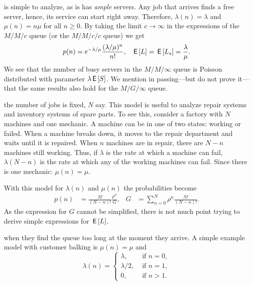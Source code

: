  is simple to analyze, as is has \emph{ample} servers.
Any job that arrives finds a free server, hence, its service can start right away.
Therefore, $\lambda(n)=\lambda$ and $\mu(n) = n \mu$ for all $n\geq 0$.
By taking the limit $c\to \infty$ in the expressions of the $M/M/c$ queue (or the $M/M/c/c$ queue) we get
\begin{align*}
  p(n) &= e^{-\lambda/\mu} \frac{(\lambda/\mu)^n}{n!}, & \,\mathsf{E}\left[L\right] = \,\mathsf{E}\left[L_s\right] = \frac \lambda \mu.
\end{align*}
We see that the number of busy servers in the $M/M/\infty$ queue is Poisson distributed with parameter $\lambda \,\mathsf{E}\left[S\right]$.
We mention in passing---but do not prove it---that the same results also hold for the $M/G/\infty$ queue.

 the number of jobs is fixed, $N$ say.
This model is useful to analyze repair systems and inventory systems of spare parts.
To see this, consider a factory with $N$ machines and one mechanic.
A machine can be in one of two states: working or failed.
When a machine breaks down, it moves to the repair department and waits until it is repaired.
When $n$ machines are in repair, there are $N-n$ machines still working.
Thus, if $\lambda$ is the rate at which a machine can fail, $\lambda(N-n)$ is the rate at which any of the working machines can fail.
Since there is one mechanic: $\mu(n)=\mu$.


With this model for $\lambda(n)$ and $\mu(n)$ the probabilities become 
\begin{align*}
 p(n)  &= \frac{N!}{(N-n)!}\frac{\rho^n}{G}, & G &= \sum_{n=0}^N \rho^n \frac{N!}{(N-n)!}.
\end{align*}
As the expression for $G$ cannot be simplified, there is not much point trying to derive simple expressions for $\,\mathsf{E}\left[L\right]$.


 when they find the queue too long at the moment they arrive.
A simple example model with customer balking is $\mu(n)=\mu$ and
 \begin{equation*}
 \lambda(n) =
 \begin{cases}
 \lambda, &\text{ if } n=0, \\
 \lambda/2, &\text{ if } n=1, \\
 0, &\text{ if } n > 1.
\end{cases}
\end{equation*}

